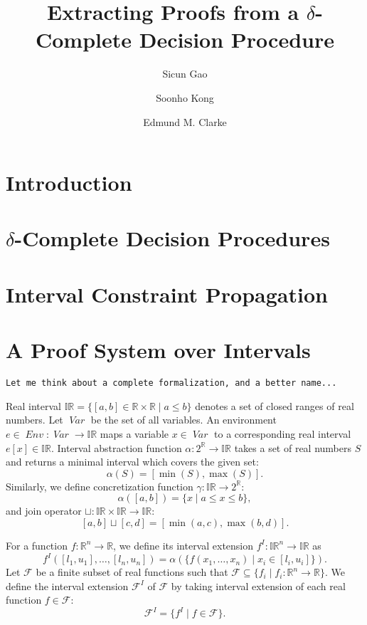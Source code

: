 \documentclass[envcountsect]{llncs}
\title{Extracting Proofs from a $\delta$-Complete Decision Procedure}
\author{Sicun Gao \and Soonho Kong \and Edmund M. Clarke}
\institute{Carnegie Mellon University, Pittsburgh, PA 15213}
\newcommand{\Var}{\mathop{\mathit{Var}}}
\newcommand{\Env}{\mathop{\mathit{Env}}}
\begin{document}
\maketitle

\begin{abstract}
\end{abstract}

\section{Introduction}

\section{$\delta$-Complete Decision Procedures}

\section{Interval Constraint Propagation}



\section{A Proof System over Intervals}

{\tt\Large Let me think about a complete formalization, and a better name...}

Real interval $\mathbb{IR} = \{ [a, b] \in \mathbb{R} \times
\mathbb{R} \mid a \le b \}$ denotes a set of closed ranges of real
numbers. Let $\Var$ be the set of all variables. An environment $e \in
\Env : \Var \to \mathbb{IR}$ maps a variable $x \in \Var$ to a
corresponding real interval $e[x] \in \mathbb{IR}$. Interval
abstraction function $\alpha : 2^{\mathbb{R}} \to \mathbb{IR}$ takes a
set of real numbers $S$ and returns a minimal interval which covers
the given set:
\[
\alpha(S) = [\min(S), \max(S)].
\]
Similarly, we define concretization function $\gamma : \mathbb{IR} \to
2^{\mathbb{R}}$:
\[
\alpha([a, b]) = \{ x \mid a \le x \le b \},
\]
and join operator $\sqcup : \mathbb{IR} \times \mathbb{IR} \to
\mathbb{IR}$:
\[
[a,b] \sqcup [c, d] = [\min(a,c), \max(b, d)].
\]


For a function $f : \mathbb{R}^n \to \mathbb{R}$, we define its
interval extension $f^I : \mathbb{IR}^n \to \mathbb{IR}$ as
\[
f^I ([l_1, u_1], \dots, [l_n, u_n]) =
\alpha(\{ f(x_1, \dots, x_n) \mid x_i  \in [l_i, u_i] \}).
\]
Let $\mathcal{F}$ be a finite subset of real functions such that
$\mathcal{F} \subseteq \{f_i \mid f_i : \mathbb{R}^n \to \mathbb{R}
\}$. We define the interval extension $\mathcal{F}^I$ of $\mathcal{F}$
by taking interval extension of each real function $f \in
\mathcal{F}$:
\[
\mathcal{F}^I = \{ f^I \mid f \in \mathcal{F} \}.
\]
\end{document}
